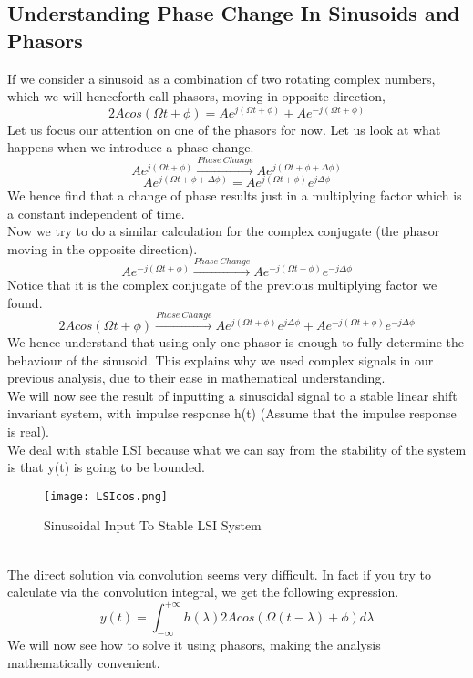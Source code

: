 \subsection{Understanding Phase Change In Sinusoids and Phasors}
If we consider a sinusoid as a combination of two rotating complex numbers, which we will henceforth call phasors, moving in opposite direction, 
\[
	2Acos(\Omega t + \phi) = Ae^{j(\Omega t + \phi)} + Ae^{-j(\Omega t + \phi)}
\]
Let us focus our attention on one of the phasors for now. Let us look at what happens when we introduce a phase change.\\
\[
Ae^{j(\Omega t + \phi)} \xrightarrow{Phase \ Change} Ae^{j(\Omega t + \phi + \Delta\phi)}
\]
\[
Ae^{j(\Omega t + \phi + \Delta\phi)} =
Ae^{j(\Omega t + \phi)}e^{j\Delta\phi}
\]
We hence find that a change of phase results just in a multiplying factor which is a constant independent of time.\\
Now we try to do a similar calculation for the complex conjugate (the phasor moving in the opposite direction).
\[
Ae^{-j(\Omega t + \phi)} \xrightarrow{Phase \ Change} Ae^{-j(\Omega t + \phi)}e^{-j\Delta\phi}
\]
Notice that it is the complex conjugate of the previous multiplying factor we found.\\
\[
	2Acos(\Omega t + \phi) \xrightarrow{Phase \ Change} Ae^{j(\Omega t + \phi)}e^{j\Delta\phi} + Ae^{-j(\Omega t + \phi)}e^{-j\Delta\phi}
\]
We hence understand that using only one phasor is enough to fully determine the behaviour of the sinusoid. This explains why we used complex signals in our previous analysis, due to their ease in mathematical understanding.\\
We will now see the result of inputting a sinusoidal signal to a stable linear shift invariant system, with impulse response h(t) (Assume that the impulse response is real).\\
We deal with stable LSI because what we can say from the stability of the system is that y(t) is going to be bounded.\\
\begin{figure}[ht]
\begin{center}
\texttt{[image: LSIcos.png]}
\caption{Sinusoidal Input To Stable LSI System}
\end{center}
\end{figure}\\
The direct solution via convolution seems very difficult. In fact if you try to calculate via the convolution integral, we get the following expression.
\[
y(t) = \int_{-\infty}^{+\infty}{h(\lambda)2Acos(\Omega(t-\lambda) + \phi)d\lambda}\]
We will now see how to solve it using phasors, making the analysis mathematically convenient.

